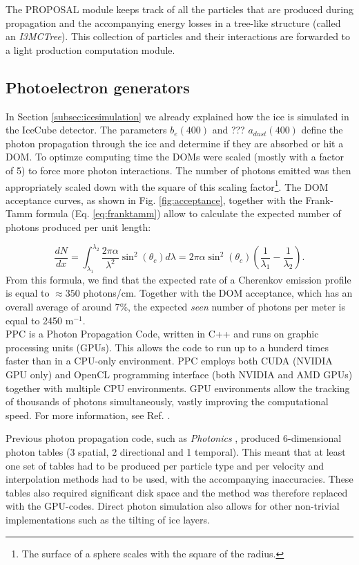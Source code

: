 \noindent The PROPOSAL module keeps track of all the particles that are produced during propagation and the accompanying energy losses in a tree-like structure (called an \textit{I3MCTree}). This collection of particles and their interactions are forwarded to a light production computation module.

\subsection{Photoelectron generators}
In Section \ref{subsec:icesimulation} we already explained how the ice is simulated in the IceCube detector. The parameters $b_e(400)$ and ??? $a_{dust}(400)$ define the photon propagation through the ice and determine if they are absorbed or hit a DOM. To optimze computing time the DOMs were scaled (mostly with a factor of 5) to force more photon interactions. The number of photons emitted was then appropriately scaled down with the square of this scaling factor\footnote{The surface of a sphere scales with the square of the radius.}. The DOM acceptance curves, as shown in Fig. \ref{fig:acceptance}, together with the Frank-Tamm formula (Eq. \ref{eq:franktamm}) allow to calculate the expected number of photons produced per unit length:

\begin{equation}
\frac{dN}{dx} = \int_{\lambda_1}^{\lambda_2} \frac{2 \pi \alpha}{\lambda^2} \sin^2 \left(\theta_c\right) d\lambda = 2\pi \alpha \sin^2 \left(\theta_c\right) \left(\frac{1}{\lambda_1} -\frac{1}{\lambda_2}\right).
\end{equation}
From this formula, we find that the expected rate of a Cherenkov emission profile is equal to $\approx 350$ photons/cm. Together with the DOM acceptance, which has an overall average of around 7\%, the expected \textit{seen} number of photons per meter is equal to 2450 m$^{-1}$.\\

\noindent PPC is a Photon Propagation Code, written in C++ and runs on graphic processing units (GPUs). This allows the code to run up to a hunderd times faster than in a CPU-only environment. PPC employs both CUDA (NVIDIA GPU only) and OpenCL programming interface (both NVIDIA and AMD GPUs) together with multiple CPU environments.
GPU environments allow the tracking of thousands of photons simultaneously, vastly improving the computational speed. For more information, see Ref. \cite{dimaspice}.

Previous photon propagation code, such as \textit{Photonics}  \cite{Lundberg:2007mf}, produced 6-dimensional photon tables (3 spatial, 2 directional and 1 temporal). This meant that at least one set of tables had to be produced per particle type and per velocity and interpolation methods had to be used, with the accompanying inaccuracies. These tables also required significant disk space and the method was therefore replaced with the GPU-codes. Direct photon simulation also allows for other non-trivial implementations such as the tilting of ice layers.\\

